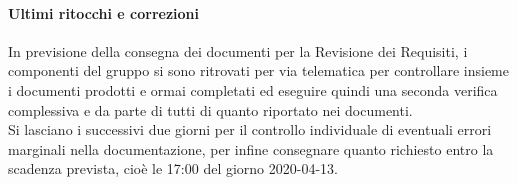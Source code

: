 \documentclass{article}
\begin{document}
\paragraph*{Ultimi ritocchi e correzioni}
In previsione della consegna dei documenti per la Revisione dei Requisiti, i componenti del gruppo si sono ritrovati per via telematica per controllare insieme i documenti prodotti e ormai completati ed eseguire quindi una seconda verifica complessiva e da parte di tutti di quanto riportato nei documenti. \\
Si lasciano i successivi due giorni per il controllo individuale di eventuali errori marginali nella documentazione, per infine consegnare quanto richiesto entro la scadenza prevista, cioè le 17:00 del giorno 2020-04-13.
\end{document}
